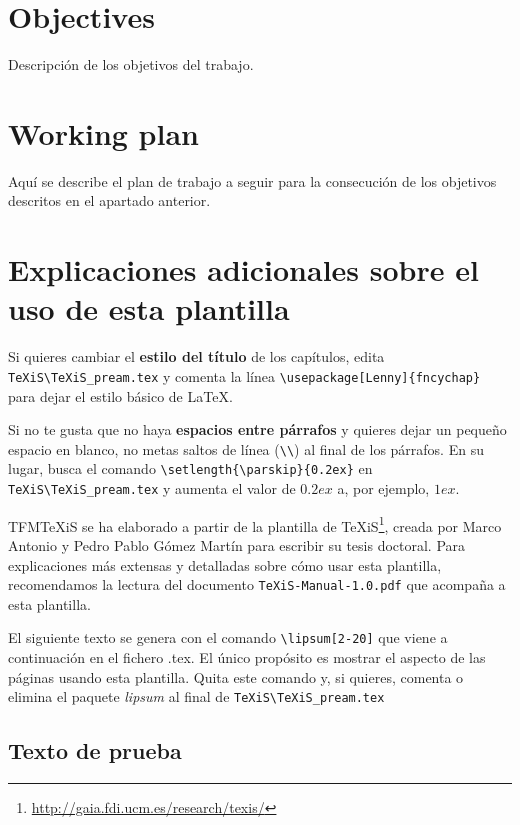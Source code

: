 \section{Objectives}
Descripción de los objetivos del trabajo.


\section{Working plan}
Aquí se describe el plan de trabajo a seguir para la consecución de los objetivos descritos en el apartado anterior.



\section{Explicaciones adicionales sobre el uso de esta plantilla}
Si quieres cambiar el \textbf{estilo del título} de los capítulos, edita \verb|TeXiS\TeXiS_pream.tex| y comenta la línea \verb|\usepackage[Lenny]{fncychap}| para dejar el estilo básico de \LaTeX.

Si no te gusta que no haya \textbf{espacios entre párrafos} y quieres dejar un pequeño espacio en blanco, no metas saltos de línea (\verb|\\|) al final de los párrafos. En su lugar, busca el comando  \verb|\setlength{\parskip}{0.2ex}| en \verb|TeXiS\TeXiS_pream.tex| y aumenta el valor de $0.2ex$ a, por ejemplo, $1ex$.

TFMTeXiS se ha elaborado a partir de la plantilla de TeXiS\footnote{\url{http://gaia.fdi.ucm.es/research/texis/}}, creada por Marco Antonio y Pedro Pablo Gómez Martín para escribir su tesis doctoral. Para explicaciones más extensas y detalladas sobre cómo usar esta plantilla, recomendamos la lectura del documento \texttt{TeXiS-Manual-1.0.pdf} que acompaña a esta plantilla.

El siguiente texto se genera con el comando \verb|\lipsum[2-20]| que viene a continuación en el fichero .tex. El único propósito es mostrar el aspecto de las páginas usando esta plantilla. Quita este comando y, si quieres, comenta o elimina el paquete \textit{lipsum} al final de \verb|TeXiS\TeXiS_pream.tex|

\subsection{Texto de prueba}

